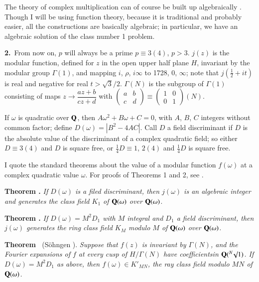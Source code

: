 The theory of complex multiplication can of course be built up algebraically \cite{art03-key3}. Though I will be using function theory, because it is traditional and probably easier, all the constructions are basically algebraic; in particular, we have an algebraic solution of the class number 1 problem.

\medskip
\noindent
{\bf 2.}~From now on, $p$ will always be a prime $p\equiv 3(4)$, $p>3$. $j(z)$ is the modular function, defined for $z$ in the open upper half plane $H$, invariant by the modular group $\Gamma(1)$, and mapping $i$, $\rho$, $i\infty$ to 1728, 0, $\infty$; note that $j(\frac{1}{2}+it)$ is real and negative for real $t>\surd 3/2$. $\Gamma(N)$ is the subgroup of $\Gamma(1)$ consisting of maps $z\to \dfrac{az+b}{cz+d}$ with $\left(\begin{smallmatrix} a & b\\ c & d\end{smallmatrix}\right)\equiv \left(\begin{smallmatrix} 1 & 0\\ 0 & 1\end{smallmatrix}\right)(N)$.

If $\omega$ is quadratic over $\mathbf{Q}$, then $A\omega^{2}+B\omega+C=0$, with $A$, $B$, $C$ integers without common factor; define $D(\omega)=|B^{2}-4AC|$. Call $D$ a field discriminant if $D$ is the absolute value of the discriminant of a complex quadratic field; so either $D\equiv 3(4)$ and $D$ is square free, or $\frac{1}{4}D\equiv 1$, $2(4)$ and $\frac{1}{4}D$ is square free.

I quote the standard theorems about the value of a modular function $f(\omega)$ at a complex quadratic value $\omega$. For proofs of Theorems 1 and 2, see \cite{art03-key3}.

\medskip
\noindent
{\bf Theorem .\label{art03-thm1}}
{\em If $D(\omega)$ is a filed discriminant, then $j(\omega)$ is an algebraic integer and generates the class field $K_{1}$ of $\mathbf{Q}(\omega)$ over $\mathbf{Q}(\omega)$.}

\medskip
\noindent
{\bf Theorem .\label{art03-thm2}}
{\em If $D(\omega)=M^{2}D_{1}$ with $M$ integral and $D_{1}$ a field discriminant, then $j(\omega)$ generates the ring class field $K_{M}$ modulo $M$ of $\mathbf{Q}(\omega)$ over $\mathbf{Q}(\omega)$.}

\medskip
\noindent
{\bf Theorem \label{art03-thm3}}~(S\"ohngen \cite{art03-key6}).
{\em Suppose that $f(z)$ is invariant by $\Gamma(N)$, and the Fourier expansions of $f$ at every cusp of $H/\Gamma(N)$ have coefficients\pageoriginale in $\mathbf{Q}({}^{N}\surd 1)$. If $D(\omega)=M^{2}D_{1}$ as above, then $f(\omega)\in K'_{MN}$, the ray class field modulo $MN$ of $\mathbf{Q}(\omega)$.}

